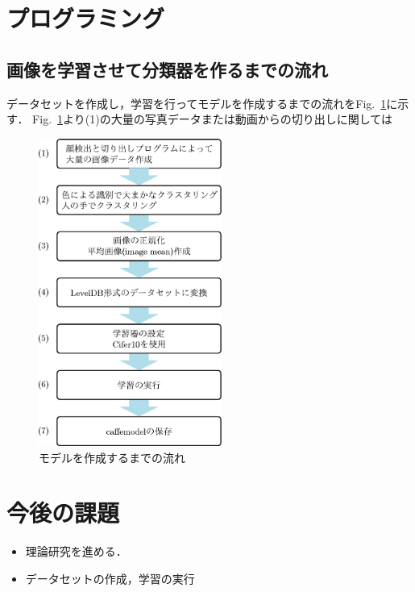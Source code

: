 \documentclass[a4paper,10pt]{jsarticle}
\begin{document}

\section{プログラミング}
\subsection{画像を学習させて分類器を作るまでの流れ}
データセットを作成し，学習を行ってモデルを作成するまでの流れをFig.~\ref{fig:モデルを作成するまでの流れ}に示す．
Fig.~\ref{fig:モデルを作成するまでの流れ}より(1)の大量の写真データまたは動画からの切り出しに関しては
\begin{figure}[tb]
  \begin{center}
    \includegraphics[clip,width=6cm]{fig/eps/learning_flow.eps}
  \end{center}
  \caption{モデルを作成するまでの流れ}
  \label{fig:モデルを作成するまでの流れ}
\end{figure}


\section{今後の課題}
\begin{itemize}
 \item 理論研究を進める．
 \item データセットの作成，学習の実行
\end{itemize}
\end{document}
